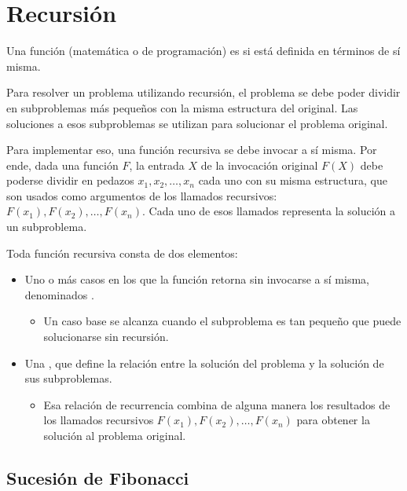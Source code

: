 \section{Recursión}

Una función (matemática o de programación) es  si está definida en términos de sí misma.

Para resolver un problema utilizando recursión, el problema se debe poder dividir en subproblemas más pequeños con la misma estructura del original. Las soluciones a esos subproblemas se utilizan para solucionar el problema original. 

Para implementar eso, una función recursiva se debe invocar a sí misma. Por ende, dada una función \(F\), la entrada \(X\) de la invocación original \(F(X)\) debe poderse dividir en pedazos \(x_1, x_2, \ldots, x_n\) cada uno con su misma estructura, que son usados como argumentos de los llamados recursivos: \(F(x_1), F(x_2), \ldots, F(x_n)\). Cada uno de esos llamados representa la solución a un subproblema.

Toda función recursiva consta de dos elementos:
\begin{itemize}
  \item Uno o más casos en los que la función retorna sin invocarse a sí misma, denominados .
  \begin{itemize}
    \item Un caso base se alcanza cuando el subproblema es tan pequeño que puede solucionarse sin recursión.
  \end{itemize}
  \item  Una , que define la relación entre la solución del problema y la solución de sus subproblemas.
  \begin{itemize}
    \item Esa relación de recurrencia combina de alguna manera los resultados de los llamados recursivos \(F(x_1), F(x_2), \ldots, F(x_n)\) para obtener la solución al problema original.
  \end{itemize}
\end{itemize}

\subsection{Sucesión de Fibonacci}
\label{sec:fibonacci_recursiva}

